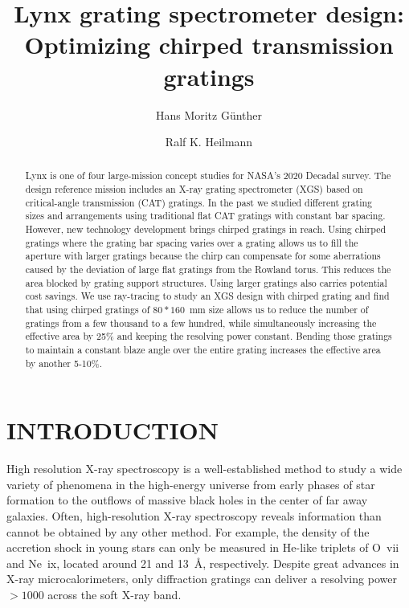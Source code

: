 \documentclass[]{spie}  %
\title{Lynx grating spectrometer design: Optimizing chirped transmission gratings}
\author[a]{Hans Moritz G\"unther}
\author[a,b]{Ralf K. Heilmann}
\affil[a]{MIT Kavli Institute for Astrophysics and Space Research, Massachusetts Institute of Technology, Cambridge, MA 02139, USA}
\affil[b]{Space Nanotechnology Laboratory, Massachusetts Institute of Technology, Cambridge, MA 02139, USA}
\begin{document}
 
\maketitle

\begin{abstract}
Lynx is one of four large-mission concept studies for NASA's 2020 Decadal survey. The design reference mission includes an X-ray grating spectrometer (XGS) based on critical-angle transmission (CAT) gratings. In the past we studied different grating sizes and arrangements using traditional flat CAT gratings with constant bar spacing. However, new technology development brings chirped gratings in reach. Using chirped gratings where the grating bar spacing varies over a grating allows us to fill the aperture with larger gratings because the chirp can compensate for some aberrations caused by the deviation of large flat gratings from the Rowland torus. This reduces the area blocked by grating support structures. Using larger gratings also carries potential cost savings.
We use ray-tracing to study an XGS design with chirped grating and find that using chirped gratings of $80 * 160$~mm size allows us to reduce the number of gratings from a few thousand to a few hundred, while simultaneously increasing the effective area by 25\% and keeping the resolving power constant. Bending those gratings to maintain a constant blaze angle over the entire grating increases the effective area by another 5-10\%.

\end{abstract}


\section{INTRODUCTION}
\label{sec:intro}
High resolution X-ray spectroscopy is a well-established method to study a wide variety of phenomena in the high-energy universe from early phases of star formation to the outflows of massive black holes in the center of far away galaxies. Often, high-resolution X-ray spectroscopy reveals information than cannot be obtained by any other method. For example, the density of the accretion shock in young stars can only be measured in He-like triplets of O~{\sc vii} and Ne~{\sc ix}, located around 21 and 13~\AA{}, respectively. Despite great advances in X-ray microcalorimeters, only diffraction gratings can deliver a resolving power $> 1000$ across the soft X-ray band.
\end{document}
